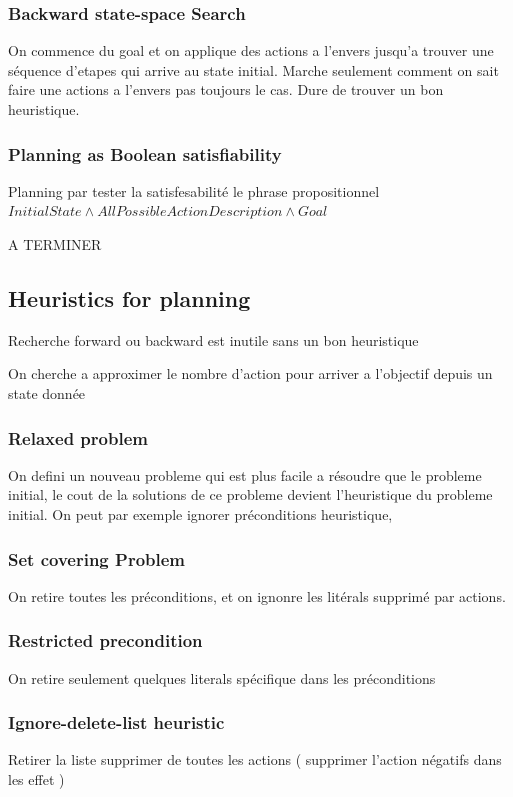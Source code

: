\documentclass[12pt]{article}
\begin{document}
		\subsubsection{Backward state-space Search}
			On commence du goal et on applique des actions a l'envers jusqu'a trouver une séquence d'etapes qui arrive au state initial. Marche seulement comment on sait faire une actions a l'envers pas toujours le cas. Dure de trouver un bon heuristique.
			
		\subsubsection{Planning as Boolean satisfiability}
			Planning par tester la satisfesabilité le phrase propositionnel $InitialState \land AllPossibleActionDescription \land Goal$
			
			A TERMINER
			
	\subsection{Heuristics for planning}
	
		Recherche forward ou backward est inutile sans un bon heuristique
		
		On cherche a approximer le nombre d'action pour arriver a l'objectif depuis un state donnée
		
		\subsubsection{Relaxed problem}
			On defini un nouveau probleme qui est plus facile a résoudre que le probleme initial, le cout de la solutions de ce probleme devient l'heuristique du probleme initial. On peut par exemple ignorer préconditions heuristique, 
		
		\subsubsection{Set covering Problem}
		
		On retire toutes les préconditions, et on ignonre les litérals supprimé par actions.
		
		\subsubsection{Restricted precondition}
		On retire seulement quelques literals spécifique dans les préconditions
		
		\subsubsection{Ignore-delete-list heuristic}
		Retirer la liste supprimer de toutes les actions ( supprimer l'action négatifs dans les effet )
		
\end{document}
